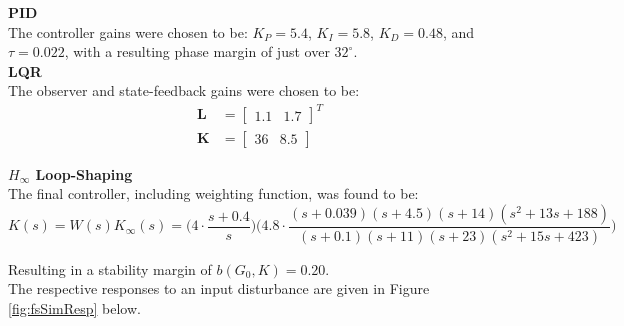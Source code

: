 \textbf{PID} \\
The controller gains were chosen to be: $K_P=5.4$, $K_I=5.8$, $K_D=0.48$, and $\tau=0.022$, with a resulting phase margin of just over $32^{\circ}$. \\

\textbf{LQR} \\
The observer and state-feedback gains were chosen to be:
\begin{align*}
\mathbf{L} &= \begin{bmatrix}
1.1 & 1.7
\end{bmatrix}^T \\
\mathbf{K} &= \begin{bmatrix}
36 & 8.5
\end{bmatrix}
\end{align*}

\textbf{$H_{\infty}$ Loop-Shaping} \\
The final controller, including weighting function, was found to be:
\begin{equation*}
K(s) = W(s) K_{\infty}(s) = \Big( 4 \cdot \frac{s+0.4}{s} \Big) \Big(4.8 \cdot \frac{(s+0.039)(s+4.5)(s+14)(s^2+13s+188)}{(s+0.1)(s+11)(s+23)(s^2+15s+423)} \Big)
\end{equation*}

Resulting in a stability margin of $b(G_0,K)=0.20$. \\

The respective responses to an input disturbance are given in Figure \ref{fig:fsSimResp} below.

